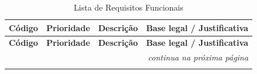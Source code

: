 \begin{longtable}{|p{1.8cm}|p{1.8cm}|p{6.5cm}|p{4cm}|}
\caption{Lista de Requisitos Funcionais}
\label{tab:requisitos_funcionais} \\

\hline
\textbf{Código} & \textbf{Prioridade} & \textbf{Descrição} & \textbf{Base legal / Justificativa} \\
\hline
\endfirsthead

\hline
\textbf{Código} & \textbf{Prioridade} & \textbf{Descrição} & \textbf{Base legal / Justificativa} \\
\hline
\endhead

\hline
\multicolumn{4}{r}{\small\textit{continua na próxima página}} \\
\endfoot

\hline
\endlastfoot


\end{longtable}
